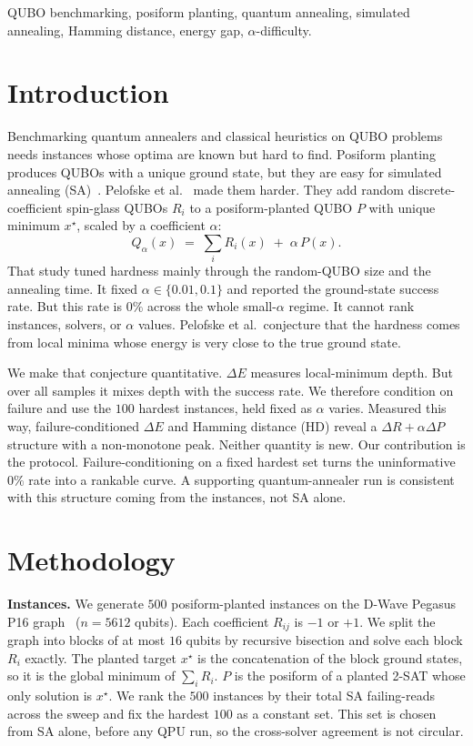 \documentclass[10pt, conference]{IEEEtran}
\begin{document}
\begin{IEEEkeywords}
QUBO benchmarking, posiform planting, quantum annealing,
simulated annealing, Hamming distance, energy gap, $\alpha$-difficulty.
\end{IEEEkeywords}

\section{Introduction}
Benchmarking quantum annealers and classical heuristics on QUBO problems needs
instances whose optima are known but hard to find. Posiform
planting~\cite{hahn2023posiform} produces QUBOs with a unique ground state, but
they are easy for simulated annealing (SA)~\cite{kirkpatrick1983}. Pelofske et
al.~\cite{pelofske2024hardened} made them harder. They add random
discrete-coefficient spin-glass QUBOs $R_i$ to a posiform-planted QUBO $P$ with
unique minimum $x^\star$, scaled by a coefficient $\alpha$:
\begin{equation}
  Q_{\alpha}(x) \;=\; \sum_{i} R_{i}(x) \;+\; \alpha\,P(x).
  \label{eq:qalpha}
\end{equation}
That study tuned hardness mainly through the random-QUBO size and the
annealing time. It fixed $\alpha\in\{0.01,0.1\}$ and reported the ground-state
success rate. But this rate is $0\%$ across the whole small-$\alpha$ regime. It
cannot rank instances, solvers, or $\alpha$ values. Pelofske et al.\ conjecture
that the hardness comes from local minima whose energy is very close to the true
ground state.

We make that conjecture quantitative. $\Delta E$ measures local-minimum depth.
But over all samples it mixes depth with the success rate. We therefore
condition on failure and use the $100$ hardest instances, held fixed as $\alpha$
varies. Measured this way, failure-conditioned $\Delta E$ and Hamming distance
(HD) reveal a $\Delta R{+}\alpha\Delta P$ structure with a non-monotone peak.
Neither quantity is new. Our contribution is the protocol. Failure-conditioning
on a fixed hardest set turns the uninformative $0\%$ rate into a rankable curve.
A supporting quantum-annealer run is consistent with this structure coming from the instances, not SA alone.

\section{Methodology}
\textbf{Instances.} We generate $500$ posiform-planted instances on the D-Wave
Pegasus P16 graph~\cite{boothby2020} ($n{=}5612$ qubits). Each coefficient
$R_{ij}$ is $-1$ or $+1$. We split the graph into blocks of at most $16$ qubits
by recursive bisection and solve each block $R_i$ exactly. The planted target
$x^\star$ is the concatenation of the block ground states, so it is the global
minimum of $\sum_i R_i$. $P$ is the posiform of a planted 2-SAT whose only
solution is $x^\star$. We rank the $500$ instances by their total SA
failing-reads across the sweep and fix the hardest $100$ as a constant set. This
set is chosen from SA alone, before any QPU run, so the cross-solver agreement
is not circular.
\end{document}
